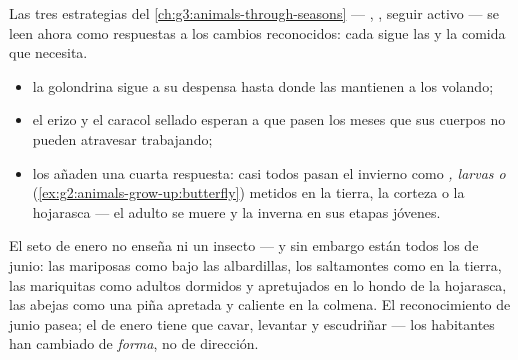\begin{proposition}\label{prop:g6:life-through-seasons:animals}
Las tres estrategias del \cref{ch:g3:animals-through-seasons} ---
, , seguir activo --- se leen ahora como respuestas a los
cambios reconocidos: cada  sigue las  y la comida que
necesita.
\begin{itemize}
  \item la golondrina sigue a su despensa hasta donde las 
        mantienen a los  volando;
  \item el erizo y el caracol sellado esperan a que pasen los meses
        que sus cuerpos no pueden atravesar trabajando;
  \item los  añaden una cuarta respuesta: casi todos pasan el
        invierno como \emph{, larvas o }
        (\cref{ex:g2:animals-grow-up:butterfly}) metidos en la tierra,
        la corteza o la hojarasca --- el adulto se muere y la 
        inverna en sus etapas jóvenes.
\end{itemize}
\end{proposition}
\admitted

\begin{example}\label{ex:g6:life-through-seasons:insects}
El seto de enero no enseña ni un insecto --- y sin embargo están todos
los de junio: las mariposas como  bajo las albardillas, los
saltamontes como  en la tierra, las mariquitas como adultos
dormidos y apretujados en lo hondo de la hojarasca, las abejas como una
piña apretada y caliente en la colmena. El reconocimiento de junio
pasea; el de enero tiene que cavar, levantar y escudriñar --- los
habitantes han cambiado de \emph{forma}, no de dirección.
\end{example}

